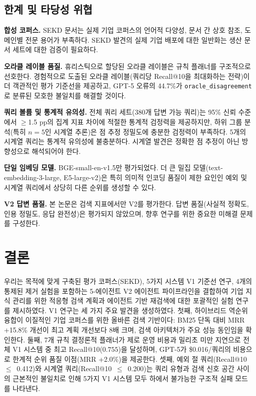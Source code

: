 \documentclass[11pt, a4paper]{article}
\begin{document}
\subsection{한계 및 타당성 위협}

\textbf{합성 코퍼스.} SEKD 문서는 실제 기업 코퍼스의 언어적 다양성, 문서 간 상호 참조, 도메인별 전문 용어가 부족하다. SEKD 발견의 실제 기업 배포에 대한 일반화는 생산 문서 세트에 대한 검증이 필요하다.

\textbf{오라클 레이블 품질.} 휴리스틱으로 할당된 오라클 레이블은 규칙 플래너를 구조적으로 선호한다. 경험적으로 도출된 오라클 레이블(쿼리당 Recall@10을 최대화하는 전략)이 더 객관적인 평가 기준선을 제공하고, GPT-5 오류의 44.7\%가 \texttt{oracle\_disagreement}로 분류된 모호한 불일치를 해결할 것이다.

\textbf{쿼리 볼륨 및 통계적 유의성.} 전체 쿼리 세트(380개 답변 가능 쿼리)는 95\% 신뢰 수준에서 $\geq$1.5 pp의 집계 지표 차이에 적절한 통계적 검정력을 제공하지만, 하위 그룹 분석(특히 $n{=}5$인 시계열 추론)은 점 추정 정밀도에 충분한 검정력이 부족하다. 5개의 시계열 쿼리는 통계적 유의성에 불충분하다. 시계열 발견은 정확한 점 추정이 아닌 방향성으로 해석되어야 한다.

\textbf{단일 임베딩 모델.} BGE-small-en-v1.5만 평가되었다. 더 큰 밀집 모델(text-embedding-3-large, E5-large-v2)은 특히 의미적 인코딩 품질이 제한 요인인 예외 및 시계열 쿼리에서 상당히 다른 순위를 생성할 수 있다.

\textbf{V2 답변 품질.} 본 논문은 검색 지표에서만 V2를 평가한다. 답변 품질(사실적 정확도, 인용 정밀도, 응답 완전성)은 평가되지 않았으며, 향후 연구를 위한 중요한 미해결 문제를 구성한다.

\section{결론}
\label{sec:conclusion}

우리는 목적에 맞게 구축된 평가 코퍼스(SEKD), 5가지 시스템 V1 기준선 연구, 4개의 통제된 제거 실험을 포함하는 5-에이전트 V2 에이전트 파이프라인을 결합하여 기업 지식 관리를 위한 적응형 검색 계획과 에이전트 기반 재검색에 대한 포괄적인 실험 연구를 제시하였다. V1 연구는 세 가지 주요 발견을 생성하였다. 첫째, 하이브리드 역순위 융합이 이질적인 기업 코퍼스를 위한 올바른 검색 기반이다: BM25 단독 대비 MRR +15.8\% 개선이 최고 계획 개선보다 8배 크며, 검색 아키텍처가 주요 성능 동인임을 확인한다. 둘째, 7개 규칙 결정론적 플래너가 제로 운영 비용과 밀리초 미만 지연으로 전체 V1 시스템 중 최고 Recall@10($0.755$)을 달성하며, GPT-5가 \$0.016/쿼리의 비용으로 한계적 순위 품질 이점(MRR +2.0\%)을 제공한다. 셋째, 예외 절 쿼리(Recall@10~$\leq$~0.412)와 시계열 쿼리(Recall@10~$\leq$~0.200)는 쿼리 유형과 검색 신호 공간 사이의 근본적인 불일치로 인해 5가지 V1 시스템 모두 하에서 불가능한 구조적 실패 모드를 나타낸다.
\end{document}
